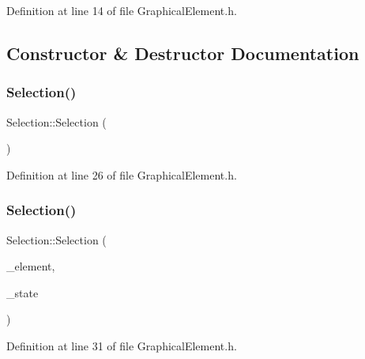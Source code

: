 Definition at line 14 of file Graphical\+Element.\+h.



\subsection{Constructor \& Destructor Documentation}
\mbox{\label{struct_selection_a53d1bd270d6d257d34d5bc8d50028049}} 
\subsubsection{\texorpdfstring{Selection()}{Selection()}\hspace{0.1cm}{\footnotesize\ttfamily [1/3]}}
{\footnotesize\ttfamily Selection\+::\+Selection (\begin{DoxyParamCaption}{ }\end{DoxyParamCaption})\hspace{0.3cm}{\ttfamily [inline]}}



Definition at line 26 of file Graphical\+Element.\+h.

\mbox{\label{struct_selection_a4f2f14073708ac849fae48b8beac678c}} 
\subsubsection{\texorpdfstring{Selection()}{Selection()}\hspace{0.1cm}{\footnotesize\ttfamily [2/3]}}
{\footnotesize\ttfamily Selection\+::\+Selection (\begin{DoxyParamCaption}\item[{\hyperlink{class_graphical_element}{Graphical\+Element} $\ast$}]{\+\_\+element,  }\item[{\hyperlink{struct_selection_a908531395e550b540712fe90c8f6fe68}{State}}]{\+\_\+state }\end{DoxyParamCaption})\hspace{0.3cm}{\ttfamily [inline]}}



Definition at line 31 of file Graphical\+Element.\+h.

\mbox{\label{struct_selection_aa48cbe228a7a072f22a80e5c412c772b}} 
